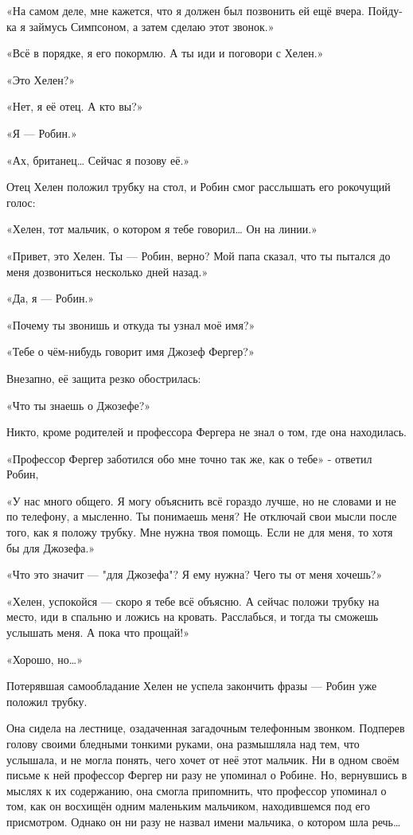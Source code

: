 \documentclass[a5paper, 9pt,
final, openany, twoside=true]{memoir}
\begin{document}
«На самом деле, мне кажется, что я должен был позвонить ей ещё вчера. Пойду-ка я займусь Симпсоном, а затем сделаю этот звонок.»

«Всё в порядке, я его покормлю. А ты иди и поговори с Хелен.»\bigskip

«Это Хелен?»

«Нет, я её отец. А кто вы?»

«Я — Робин.»

«Ах, британец… Сейчас я позову её.»

Отец Хелен положил трубку на стол, и Робин смог расслышать его рокочущий голос:

«Хелен, тот мальчик, о котором я тебе говорил… Он на линии.»\bigskip

«Привет, это Хелен. Ты — Робин, верно? Мой папа сказал, что ты пытался до меня дозвониться несколько дней назад.»

«Да, я — Робин.»

«Почему ты звонишь и откуда ты узнал моё имя?»

«Тебе о чём-нибудь говорит имя Джозеф Фергер?»

Внезапно, её защита резко обострилась:

«Что ты знаешь о Джозефе?»

Никто, кроме родителей и профессора Фергера не знал о том, где она находилась.

«Профессор Фергер заботился обо мне точно так же, как о тебе» - ответил Робин,

«У нас много общего. Я могу объяснить всё гораздо лучше, но не словами и не по телефону, а мысленно. Ты понимаешь меня? Не отключай свои мысли после того, как я положу трубку. Мне нужна твоя помощь. Если не для меня, то хотя бы для Джозефа.»

«Что это значит — "для Джозефа"? Я ему нужна? Чего ты от меня хочешь?»

«Хелен, успокойся — скоро я тебе всё объясню. А сейчас положи трубку на место, иди в спальню и ложись на кровать. Расслабься, и тогда ты сможешь услышать меня. А пока что прощай!»

«Хорошо, но…»

Потерявшая самообладание Хелен не успела закончить фразы — Робин уже положил трубку.\bigskip

Она сидела на лестнице, озадаченная загадочным телефонным звонком. Подперев голову своими бледными тонкими руками, она размышляла над тем, что услышала, и не могла понять, чего хочет от неё этот мальчик. Ни в одном своём письме к ней профессор Фергер ни разу не упоминал о Робине. Но, вернувшись в мыслях к их содержанию, она смогла припомнить, что профессор упоминал о том, как он восхищён одним маленьким мальчиком, находившемся под его присмотром. Однако он ни разу не назвал имени мальчика, о котором шла речь…
\end{document}
